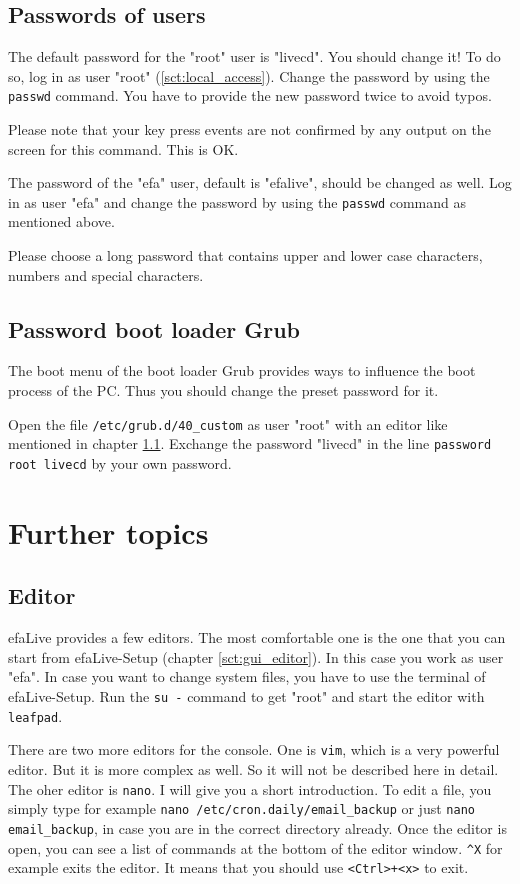 \documentclass[a4paper,12pt,twoside]{article}
\begin{document}
\subsection{Passwords of users}
\label{sct:password_admin}
The default password for the "root" user is
"livecd". You should change it! To do so,
log in as user "root" (\ref{sct:local_access}). Change the
password by using the \texttt{passwd} command. You
have to provide the new password twice to avoid typos.

Please note that your key press events are not confirmed by any output
on the screen for this command. This is OK.

The password of the "efa" user, default is "efalive", should be changed as well. 
Log in as user "efa" and change the password by using the \texttt{passwd} command
as mentioned above.

Please choose a long password that contains upper and lower case
characters, numbers and special characters.


\subsection{Password boot loader Grub}
\label{sct:password_grub}
The boot menu of the boot loader Grub \cite{GRB1} provides ways to
influence the boot process of the PC. Thus you should change the preset
password for it.

Open the file \texttt{/etc/grub.d/40\_custom} as user
"root" with an editor like mentioned in
chapter \ref{sct:editor}. Exchange the password "livecd"
in the line \texttt{password root livecd} by your
own password.


\section{Further topics}
\label{sct:further_topics}
\subsection{Editor}
\label{sct:editor}
efaLive provides a few editors. The
most comfortable one is the one that you can start from efaLive-Setup
(chapter \ref{sct:gui_editor}). In this case you work as user
"efa". In case you want to change system
files, you have to use the terminal of efaLive-Setup. Run the
\texttt{su -} command to get
"root" and start the editor with
\texttt{leafpad}. 

There are two more editors for the console. One is
\texttt{vim}, which is a very powerful editor. But
it is more complex as well. So it will not be described here in detail.
The oher editor is \texttt{nano}. I will give you
a short introduction. To edit a file, you simply type for example
\texttt{nano /etc/cron.daily/email\_backup} or
just \texttt{nano email\_backup}, in case you are
in the correct directory already. Once the editor is open, you can see
a list of commands at the bottom of the editor window.
\texttt{\^{}X} for example exits the editor. It
means that you should use
\texttt{{\textless}Ctrl{\textgreater}+{\textless}x{\textgreater}} to exit.
\end{document}
